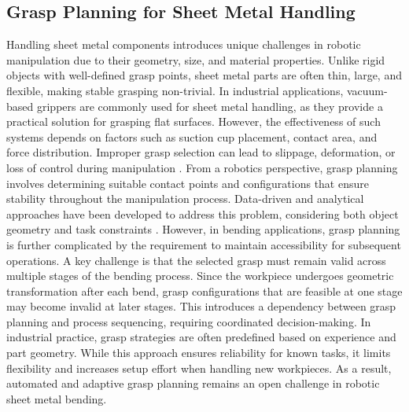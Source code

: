 \subsection{Grasp Planning for Sheet Metal Handling}
Handling sheet metal components introduces unique challenges in robotic manipulation due to their geometry, size, and material properties. Unlike rigid objects with well-defined grasp points, sheet metal parts are often thin, large, and flexible, making stable grasping non-trivial.
In industrial applications, vacuum-based grippers are commonly used for sheet metal handling, as they provide a practical solution for grasping flat surfaces. However, the effectiveness of such systems depends on factors such as suction cup placement, contact area, and force distribution. Improper grasp selection can lead to slippage, deformation, or loss of control during manipulation \cite{VacuumGripperModeling}.
From a robotics perspective, grasp planning involves determining suitable contact points and configurations that ensure stability throughout the manipulation process. Data-driven and analytical approaches have been developed to address this problem, considering both object geometry and task constraints \cite{bohg2014data}. However, in bending applications, grasp planning is further complicated by the requirement to maintain accessibility for subsequent operations.
A key challenge is that the selected grasp must remain valid across multiple stages of the bending process. Since the workpiece undergoes geometric transformation after each bend, grasp configurations that are feasible at one stage may become invalid at later stages. This introduces a dependency between grasp planning and process sequencing, requiring coordinated decision-making.
In industrial practice, grasp strategies are often predefined based on experience and part geometry. While this approach ensures reliability for known tasks, it limits flexibility and increases setup effort when handling new workpieces. As a result, automated and adaptive grasp planning remains an open challenge in robotic sheet metal bending.

